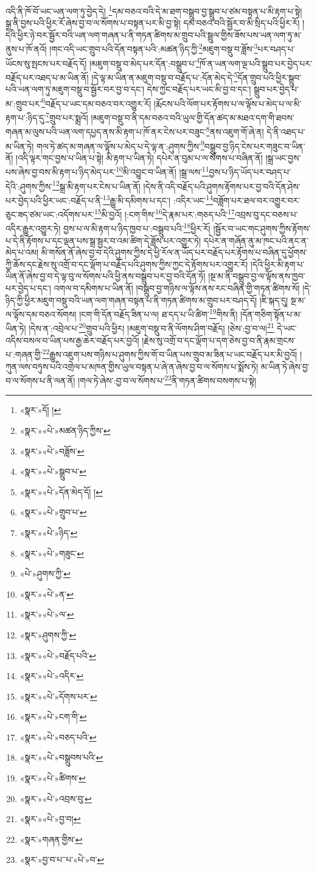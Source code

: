 འདི་ནི་ཁོ་བོ་ཡང་ཡན་ལག་ཏུ་བྱེད་དེ། \footnote{«སྣར་»དོ། ། }དམ་བཅའ་བའི་དེ་མ་ཐག་བསྒྲུབ་བྱ་སྒྲུབ་པ་ཙམ་བསྟན་པ་མི་རྟག་པ་སྟེ། སྒྲ་ནི་བྱས་པའི་ཕྱིར་རོ་ཞེས་བྱ་བ་ལ་སོགས་པ་བསྟན་པར་མི་བྱ་སྟེ། དམ་བཅའ་བའི་སྦྱོར་བ་མི་སྲིད་པའི་ཕྱིར་རོ། །དེའི་ཕྱིར་ཉེ་བར་སྦྱོར་བའི་ཡན་ལག་གཞན་པ་ནི་གཏན་ཚིགས་མ་གྲུབ་པའི་སྦྲུལ་གྱིས་ཟོས་པས་ཡན་ལག་ཏུ་མ་ནུས་པ་ཁོ་ནའོ། །གང་འདི་ཡང་གྲུབ་པའི་དོན་བསྟན་པའི་:མཚན་ཉིད་ཀྱི་\footnote{«སྣར་»«པེ་»མཚན་ཉིད་ཀྱིས་}མཇུག་བསྡུ་བ་ཟློས་\footnote{«སྣར་»«པེ་»བཟློས་}པར་བཤད་པ་ཡོངས་སུ་སྤངས་པར་བརྗོད་དོ། །མཇུག་བསྡུ་བ་མེད་པར་དོན་:བསྒྲུབ་པ་\footnote{«སྣར་»«པེ་»སྒྲུབ་པ་}ཁོ་ན་ཡན་ལག་ལྔ་པའི་སྒྲུབ་པར་བྱེད་པར་བརྗོད་པར་འཐད་པ་མ་ཡིན་ནོ། །དེ་ལྟ་མ་ཡིན་ན་མཇུག་བསྡུ་བ་བརྗོད་པ་:དོན་མེད་དེ་\footnote{«སྣར་»«པེ་»དོན་མེད་དོ། །}དོན་གྲུབ་པའི་ཕྱིར་སྒྲུབ་པའི་ཡན་ལག་ཏུ་མཇུག་བསྡུ་བ་སྦྱོར་བར་བྱ་བ་དང་། དེས་ཀྱང་བརྗོད་པར་ཡང་མི་བྱ་བ་དང་། སྒྲུབ་པར་བྱེད་པ་མ་:གྲུབ་པར་\footnote{«སྣར་»«པེ་»གྲུབ་པ་}བརྗོད་པ་ཡང་དམ་བཅའ་བར་འགྱུར་རོ། །རྨོངས་པའི་ལོག་པར་རྟོགས་པ་ལ་ལྟོས་པ་མེད་པ་ལ་མི་རྟག་པ་:ཉིད་དུ་\footnote{«སྣར་»«པེ་»ཉིད་}གྲུབ་པར་སྨྲའོ། །མཇུག་བསྡུ་བ་ནི་དམ་བཅའ་བའི་ཡུལ་གྱི་དོན་ཚད་མ་མཐའ་དག་གི་ཐབས་གཞན་མ་ལུས་པའི་ཡན་ལག་དཔྱད་ནས་མི་རྟག་པ་ཁོ་ནར་ངེས་པར་བཟུང་\footnote{«སྣར་»«པེ་»གཟུང་}ནས་འཇུག་གོ་ཞེ་ན། དེ་ནི་འཐད་པ་མ་ཡིན་ཏེ། གལ་ཏེ་ཚད་མ་གཞན་ལ་ལྟོས་པ་མེད་པ་དེ་ལྟ་ན་:ཤུགས་ཀྱིས་\footnote{«པེ་»ཤུགས་ཀྱི་}བསྒྲུབ་བྱ་ཉིད་ངེས་པར་གཟུང་བ་ཡིན་ནོ། །འདི་ལྟར་གང་བྱས་པ་ཡིན་པ་སྟེ། མི་རྟག་པ་ཡིན་ཏེ། དཔེར་ན་བུམ་པ་ལ་སོགས་པ་བཞིན་ནོ། །སྒྲ་ཡང་བྱས་པས་ཞེས་བྱ་བས་མི་རྟག་པ་ཉིད་མེད་པར་\footnote{«སྣར་»«པེ་»ན་}མི་འབྱུང་བ་ཡིན་ནོ། །སྒྲ་ལས་\footnote{«སྣར་»«པེ་»ལ་}བྱས་པ་ཉིད་ཡོད་པར་བཤད་པ་དེའི་:ཤུགས་ཀྱིས་\footnote{«སྣར་»ཤུགས་ཀྱི་}སྒྲ་མི་རྟག་པར་ངེས་པ་ཡིན་ནོ། །དེས་ནི་འདི་བརྗོད་པའི་ཤུགས་རྟོགས་པར་བྱ་བའི་དོན་ཤེས་པར་བྱེད་པའི་ཕྱིར་ཡང་:བརྗོད་པ་ནི་\footnote{«སྣར་»«པེ་»བརྗོད་པའི་}རྒྱུ་མི་དམིགས་པ་དང་། :འདིར་ཡང་\footnote{«སྣར་»«པེ་»འདིར་}བཟློག་པར་ཐལ་བར་འགྱུར་བར་ཅུང་ཟད་ཙམ་ཡང་:འདོགས་པར་\footnote{«སྣར་»«པེ་»དོགས་པར་}མི་བྱའོ། །:ངག་གིས་\footnote{«སྣར་»«པེ་»ངག་གི་}དེ་རྣམ་པར་:གཅད་པའི་\footnote{«སྣར་»«པེ་»བཅད་པའི་}འབྲས་བུ་དང་བཅས་པ་འདིར་རྒྱུར་འགྱུར་ཏེ། བྱས་པ་ལ་མི་རྟག་པ་ཉིད་ཁྱབ་པ་:བསྒྲུབ་པའི་\footnote{«སྣར་»«པེ་»བསྒྲུབས་པའི་}ཕྱིར་རོ། །སྦྱོར་བ་ཡང་གང་ཤུགས་ཀྱིས་རྟོགས་པ་དེ་ནི་རྟོགས་པ་དང་ལྡན་པས་སྒྲ་སྦྱར་བ་འམ་ཚིག་དེ་ཟློས་པར་འགྱུར་ཏེ། དཔེར་ན་གཞོན་ནུ་མ་ཁང་པའི་ནང་ན་མེད་པ་འམ། མི་གསོན་ནོ་ཞེས་བྱ་བ་དེའི་ཤུགས་ཀྱིས་དེ་ཕྱི་རོལ་ན་ཡོད་པར་བརྗོད་པར་རྟོགས་པ་བཞིན་དུ་ཕྱོགས་ཀྱི་ཆོས་དང་རྗེས་སུ་འགྲོ་བ་དང་ལྡོག་པ་བརྗོད་པའི་ཤུགས་ཀྱིས་ཀྱང་དེ་རྟོགས་པར་འགྱུར་རོ། །དེའི་ཕྱིར་མི་རྟག་པ་ཡིན་ནོ་ཞེས་བྱ་བ་དེ་ལྟ་བུ་ལ་སོགས་པའི་ཕྱི་ནས་བསྒྲུབ་པར་བྱ་བའི་དོན་ཏོ། །སྔ་མ་ནི་བསྒྲུབ་བྱ་ལ་ལྟོས་ནས་ཁྱབ་པར་བྱེད་པ་དང་། འགལ་བ་དམིགས་པ་ཡིན་ནོ། །བསྒྲུབ་བྱ་གཉིས་ལ་ལྟོས་ནས་རང་བཞིན་གྱི་གཏན་ཚིགས་སོ། །དེ་ཉིད་ཀྱི་ཕྱིར་མཇུག་བསྡུ་བའི་ཡན་ལག་གཞན་བསྟན་པ་ནི་གཏན་ཚིགས་མ་གྲུབ་པར་བཤད་དོ། །ཇི་སྐད་དུ། སྔ་མ་ལ་ལྟོས་དམ་བཅའ་སོགས། །ངག་གི་དོན་བརྗོད་ཟིན་པ་ལ། ཐ་དད་པ་ཡི་ཚིག་\footnote{«སྣར་»«པེ་»ཚིགས་}གིས་ནི། །དོན་གཅིག་སྟོན་པ་མ་ཡིན་ཏེ། །དེས་ན་:འབྲེལ་པ་\footnote{«སྣར་»«པེ་»འབྲས་བུ་}གྲུབ་པའི་ཕྱིར། །མཇུག་བསྡུ་བ་ནི་ལོགས་ཤིག་བརྗོད། །ཅེས་:བྱ་བ་ལ།\footnote{«སྣར་»«པེ་»བྱ་བ།} དེ་ཡང་འདིས་བསལ་བ་ཡིན་པས་རྒྱ་ཆེར་བརྗོད་པར་བྱའོ། །རྗེས་སུ་འགྲོ་བ་དང་ལྡོག་པ་དག་ཅེས་བྱ་བ་ནི་རྣམ་གྲངས་པ་:གཞན་གྱི་\footnote{«སྣར་»གཞན་གྱིས་}རྒྱུས་འཇུག་པས་གཉིས་པ་ཤུགས་ཀྱིས་གོ་བ་ཡིན་པས་གྲུབ་མ་ཟིན་པ་ཡང་བརྗོད་པར་མི་བྱའོ། །ཀུན་ལས་བཏུས་པའི་འགྲེལ་པ་མཁན་གྱིས་ཡུལ་བསྟན་པ་ཞེ་ན་ཞེས་བྱ་བ་ལ་སོགས་པ་སྨོས་ཏེ། མ་ཡིན་ཏེ་ཞེས་བྱ་བ་ལ་སོགས་པ་ནི་ལན་ནོ། །གལ་ཏེ་ཞེས་:བྱ་བ་ལ་སོགས་པ་\footnote{«སྣར་»བྱ་བ་པ་་པ་«པེ་»བ་}ནི་གཏན་ཚིགས་བསགས་པ་སྟེ། 